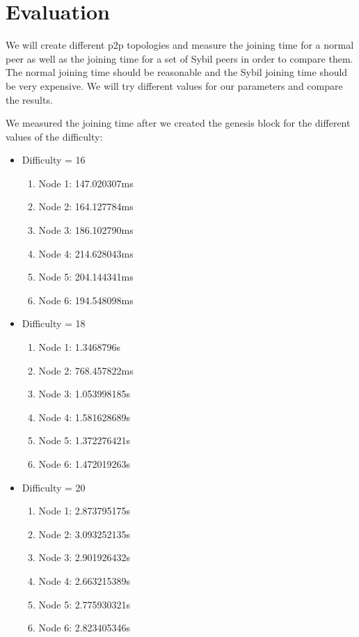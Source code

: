 \documentclass[twocolumn]{article}
\begin{document}
\section{Evaluation}
We will create different p2p topologies and measure the joining time for a normal peer as well as the joining time for a set of Sybil peers in order to compare them. The normal joining time should be reasonable and the Sybil joining time should be very expensive. We will try different values for our parameters and compare the results.

We measured the joining time after we created the genesis block for the different values of the difficulty:
\begin{itemize}
    \item Difficulty = 16
    \begin{enumerate}
        \item Node 1: 147.020307ms
        \item Node 2: 164.127784ms	
        \item Node 3: 186.102790ms	
        \item Node 4: 214.628043ms
        \item Node 5: 204.144341ms
        \item Node 6: 194.548098ms
    \end{enumerate}
    \item Difficulty = 18
        \begin{enumerate}
        \item Node 1: 1.3468796s
        \item Node 2: 768.457822ms	
        \item Node 3: 1.053998185s	
        \item Node 4: 1.581628689s
        \item Node 5: 1.372276421s
        \item Node 6: 1.472019263s
    \end{enumerate}
    \item Difficulty = 20
        \begin{enumerate}
            \item Node 1: 2.873795175s
            \item Node 2: 3.093252135s	
            \item Node 3: 2.901926432s
            \item Node 4: 2.663215389s
            \item Node 5: 2.775930321s
            \item Node 6: 2.823405346s

\end{enumerate}
\end{itemize}
\end{document}
